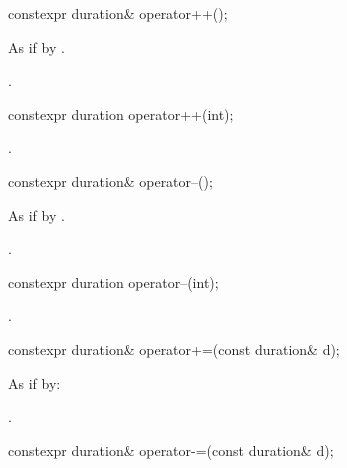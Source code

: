 %
\begin{itemdecl}
constexpr duration& operator++();
\end{itemdecl}

\begin{itemdescr}
\pnum
\effects As if by .

\pnum
\returns {}.
\end{itemdescr}

%
\begin{itemdecl}
constexpr duration operator++(int);
\end{itemdecl}

\begin{itemdescr}
\pnum
\returns {}.
\end{itemdescr}

%
\begin{itemdecl}
constexpr duration& operator--();
\end{itemdecl}

\begin{itemdescr}
\pnum
\effects As if by .

\pnum
\returns {}.
\end{itemdescr}

%
\begin{itemdecl}
constexpr duration operator--(int);
\end{itemdecl}

\begin{itemdescr}
\pnum
\returns {}.
\end{itemdescr}

%
\begin{itemdecl}
constexpr duration& operator+=(const duration& d);
\end{itemdecl}

\begin{itemdescr}
\pnum
\effects As if by: 

\pnum
\returns {}.
\end{itemdescr}

%
\begin{itemdecl}
constexpr duration& operator-=(const duration& d);
\end{itemdecl}

